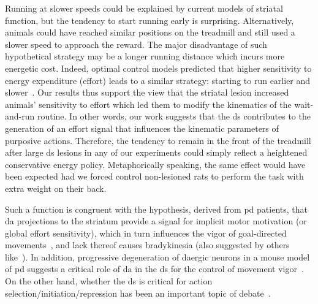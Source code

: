 Running at slower speeds could be explained by current models of striatal function, but the tendency to start running early is surprising.
Alternatively, animals could have reached similar positions on the treadmill and still used a slower speed to approach the reward.
The major disadvantage of such hypothetical strategy may be a longer running distance which incurs more energetic cost.
Indeed, optimal control models predicted that higher sensitivity to energy expenditure (effort) leads to a similar strategy: starting to run earlier and slower~\cite{JuradoParras2020}.
Our results thus support the view that the striatal lesion increased animals' sensitivity to effort which led them to modify the kinematics of the wait-and-run routine.
In other words, our work suggests that the \gls{ds} contributes to the generation of an effort signal that influences the kinematic parameters of purposive actions.
Therefore, the tendency to remain in the front of the treadmill after large \gls{ds} lesions in any of our experiments could simply reflect a heightened conservative energy policy.
Metaphorically speaking, the same effect would have been expected had we forced control non-lesioned rats to perform the task with extra weight on their back.
\par
Such a function is congruent with the hypothesis, derived from \gls{pd} patients, that \gls{da} projections to the striatum provide a signal for implicit motor motivation (or global effort sensitivity), which in turn influences the vigor of goal-directed movements~\cite{Mazzoni2007}, and lack thereof causes bradykinesia (also suggested by others like~\cite{Berke2018NN, Beeler2012Fron}).
In addition, progressive degeneration of \gls{da}ergic neurons in a mouse model of \gls{pd} suggests a critical role of \gls{da} in the \gls{ds} for the control of movement vigor~\cite{Panigrahi2015Cell}.
On the other hand, whether the \gls{ds} is critical for action selection/initiation/repression has been an important topic of debate~\cite{Turner2010CurrOpinNeurobiol, Dudman2016CurrOpinNeurobiol}.
